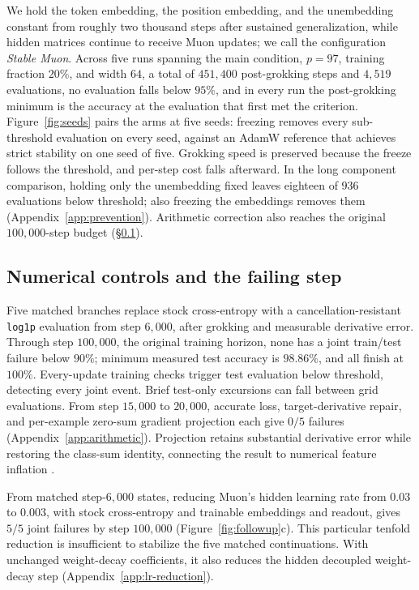 \documentclass{article}
\begin{document}
We hold the token embedding, the position embedding, and the unembedding constant from roughly two thousand steps after sustained generalization, while hidden matrices continue to receive Muon updates; we call the configuration \emph{Stable Muon}. Across five runs spanning the main condition, $p=97$, training fraction $20\%$, and width $64$, a total of $451{,}400$ post-grokking steps and $4{,}519$ evaluations, no evaluation falls below $95\%$, and in every run the post-grokking minimum is the accuracy at the evaluation that first met the criterion. Figure~\ref{fig:seeds} pairs the arms at five seeds: freezing removes every sub-threshold evaluation on every seed, against an AdamW reference that achieves strict stability on one seed of five. Grokking speed is preserved because the freeze follows the threshold, and per-step cost falls afterward. In the long component comparison, holding only the unembedding fixed leaves eighteen of $936$ evaluations below threshold; also freezing the embeddings removes them (Appendix~\ref{app:prevention}). Arithmetic correction also reaches the original $100{,}000$-step budget (\S\ref{sec:arithmetic}).




\subsection{Numerical controls and the failing step}
\label{sec:arithmetic}

Five matched branches replace stock cross-entropy with a cancellation-resistant \texttt{log1p} evaluation from step $6{,}000$, after grokking and measurable derivative error. Through step $100{,}000$, the original training horizon, none has a joint train/test failure below $90\%$; minimum measured test accuracy is $98.86\%$, and all finish at $100\%$. Every-update training checks trigger test evaluation below threshold, detecting every joint event. Brief test-only excursions can fall between grid evaluations. From step $15{,}000$ to $20{,}000$, accurate loss, target-derivative repair, and per-example zero-sum gradient projection each give $0/5$ failures (Appendix~\ref{app:arithmetic}). Projection retains substantial derivative error while restoring the class-sum identity, connecting the result to numerical feature inflation \citep{liu2026glitching}.

From matched step-$6{,}000$ states, reducing Muon's hidden learning rate from $0.03$ to $0.003$, with stock cross-entropy and trainable embeddings and readout, gives $5/5$ joint failures by step $100{,}000$ (Figure~\ref{fig:followup}c). This particular tenfold reduction is insufficient to stabilize the five matched continuations. With unchanged weight-decay coefficients, it also reduces the hidden decoupled weight-decay step (Appendix~\ref{app:lr-reduction}).
\end{document}
